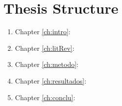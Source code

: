 \section{Thesis Structure}



\color{blue}{This thesis is organized into five distinct chapters, each contributing uniquely to the overarching research endeavor:}
\begin{enumerate}
\item  Chapter \ref{ch:intro}: 
\item  Chapter \ref{ch:litRev}: 
\item Chapter \ref{ch:metodo}: 
\item Chapter \ref{ch:resultados}: 
\item Chapter \ref{ch:conclu}: 
\end{enumerate}


